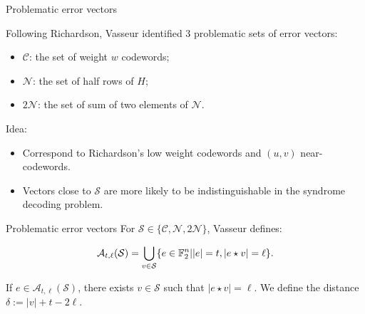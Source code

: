 \begin{frame}{Problematic error vectors}

    Following Richardson, Vasseur identified $3$ problematic sets of error vectors:

    \begin{itemize}
        \item $\mathcal{C}$: the set of weight $w$ codewords;
        \item $\mathcal{N}$: the set of half rows of $H$;
        \item $2\mathcal{N}$: the set of sum of two elements of $\mathcal{N}$.
    \end{itemize}
    
    Idea:
    \begin{itemize}
        \item Correspond to Richardson's low weight codewords and $(u,v)$ near-codewords.
        \item Vectors close to $\mathcal{S}$ are more likely to be indistinguishable in the syndrome decoding problem.
    \end{itemize}

    
\end{frame}

\begin{frame}{Problematic error vectors}
        For $\mathcal{S} \in \{ \mathcal{C},\mathcal{N}, 2\mathcal{N}\}$, Vasseur defines:
    
    \[
    \mathcal{A}_{t,\ell}(\mathcal{S}) = \bigcup_{v \in \mathcal{S}} \{ e \in \mathbb{F}_2^n| |e| = t, |e \star v| = \ell \}.
    \]
    
    If $e \in \mathcal{A}_{t,\ell}(\mathcal{S})$, there exists $v\in \mathcal{S}$ such that $|e \star v| = \ell$. We define the distance $\delta:= |v| + t - 2\ell$.
    
\end{frame}


